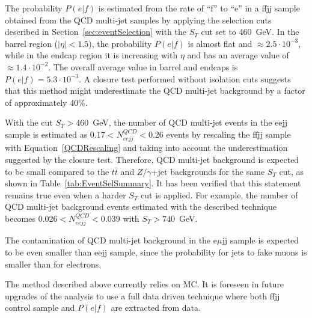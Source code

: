 The probability $P(e|f)$ is estimated from the rate of ``f'' to ``e'' in a ffjj sample obtained
from the QCD multi-jet samples by applying the selection cuts described in 
Section~\ref{sec:eventSelection} with the $S_T$ cut set to 460~GeV.
In the barrel region ($|\eta|<1.5$), the probability $P(e|f)$ is almost flat and $\approx 2.5 \cdot 10^{-3}$,  
while in the endcap region it is increasing with $\eta$ and has an average value of $\approx 1.4 \cdot 10^{-2}$.
The overall average value in barrel and endcaps is $P(e|f) = 5.3 \cdot 10^{-3}$.
A closure test performed without isolation cuts suggests 
that this method might underestimate the 
QCD multi-jet background by a factor of approximately 40\%.


With the cut $S_T>460$~GeV, the number of QCD multi-jet events in the eejj sample is estimated as 
$0.17<N_{eejj}^{QCD}<0.26$ events by rescaling the ffjj sample 
with Equation~\ref{QCDRescaling} and 
taking into account the underestimation suggested by the closure test.
Therefore, QCD multi-jet background is expected to be small compared to 
the $t\bar{t}$ and $Z/\gamma$+jet backgrounds for the same $S_T$ cut, 
as shown in Table~\ref{tab:EventSelSummary}. 
It has been verified that this statement remains true even when a harder $S_T$ cut is applied.
For example, the number of QCD multi-jet background events estimated with the described technique
becomes $0.026<N_{eejj}^{QCD}<0.039$ with $S_T>740$~GeV.

The contamination of QCD multi-jet background in the e$\mu$jj sample 
is expected to be even smaller than eejj sample, since the probability for jets to fake muons 
is smaller than for electrons. %

The method described above currently relies on MC. 
It is foreseen in future upgrades of the analysis to use a full data driven technique where 
both ffjj control sample and $P(e|f)$ are extracted from data. 

%

